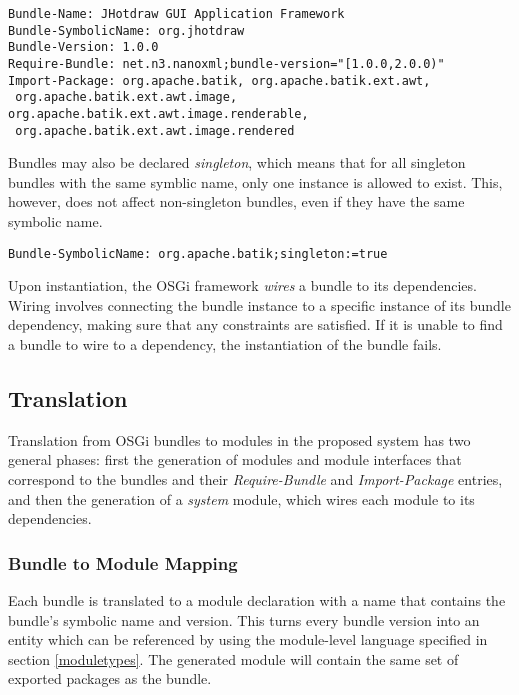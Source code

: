 \begin{lstlisting}[caption=Require-bundle and Import-package]
Bundle-Name: JHotdraw GUI Application Framework
Bundle-SymbolicName: org.jhotdraw
Bundle-Version: 1.0.0
Require-Bundle: net.n3.nanoxml;bundle-version="[1.0.0,2.0.0)"
Import-Package: org.apache.batik, org.apache.batik.ext.awt,
 org.apache.batik.ext.awt.image, org.apache.batik.ext.awt.image.renderable,
 org.apache.batik.ext.awt.image.rendered
\end{lstlisting}

Bundles may also be declared \textit{singleton}, which means that for all
singleton bundles with the same symblic name, only one instance is allowed to
exist. This, however, does not affect non-singleton bundles, even if they have
the same symbolic name.

\begin{lstlisting}[caption=Singleton Bundle]
Bundle-SymbolicName: org.apache.batik;singleton:=true
\end{lstlisting}

Upon instantiation, the OSGi framework \textit{wires} a bundle to its dependencies.
Wiring involves connecting the bundle instance to a specific instance of its bundle dependency, making
sure that any constraints are satisfied. If it is unable to find a bundle to wire to a
dependency, the instantiation of the bundle fails.

\subsection{Translation}

Translation from OSGi bundles to modules in the proposed system has two general phases:
first the generation of modules and module interfaces that correspond to the bundles and
their \textit{Require-Bundle} and \textit{Import-Package} entries, and then the generation of
a \textit{system} module, which wires each module to its dependencies.

\subsubsection{Bundle to Module Mapping}

Each bundle is translated to a module declaration with a name that contains the bundle's
symbolic name and version. This turns every bundle version into an entity which
can be referenced by using the module-level language specified in section \ref{moduletypes}.
The generated module will contain the same set of exported packages as the bundle.

